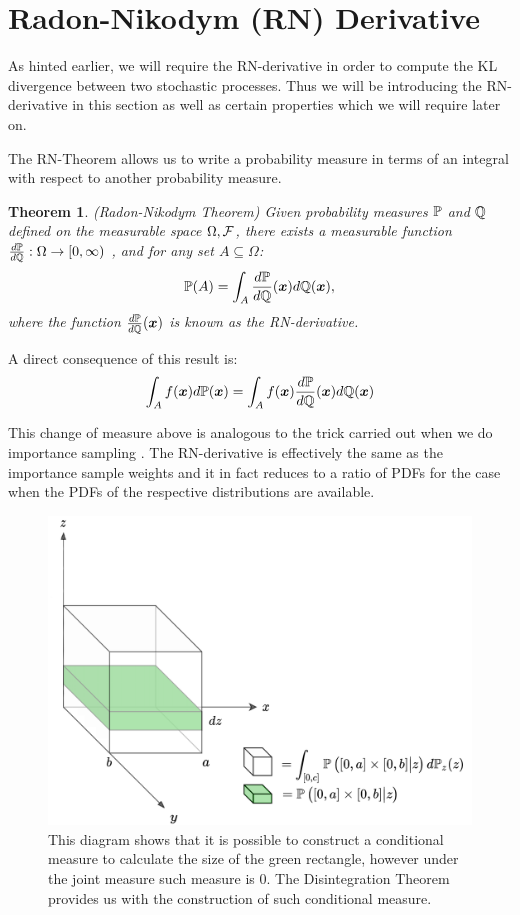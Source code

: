 \documentclass[a4paper,12pt,twoside,openright]{report}
\newtheorem{theorem}{Theorem}
\theoremstyle{definition}
\begin{document}
\section{Radon-Nikodym (RN) Derivative}

As hinted earlier, we will require the RN-derivative in order to compute the KL divergence between two stochastic processes. Thus we will be introducing the RN-derivative in this section as well as certain properties which we will require later on.

The RN-Theorem allows us to write a probability measure in terms of an integral with respect to another probability measure. 

\begin{theorem}
(Radon-Nikodym Theorem)
Given probability measures $\P$ and $\Q$ defined on the measurable space $\Omega, \calF$, there exists a measurable function $\frac{d\P}{d\Q}:\Omega \rightarrow [0, \infty)$ , and for any  set $A \subseteq  \Omega$:
\begin{align}
    \P(A) = \int_{A} \frac{d\P}{d\Q}(\vx) d\Q(\vx),
\end{align}
where the function $\frac{d\P}{d\Q}(\vx)$ is known as the RN-derivative.
\end{theorem}

A direct consequence of this result is:
\begin{align*}
    \int_A f(\vx) d\P(\vx) =  \int_{A} f(\vx)  \frac{d\P}{d\Q}(\vx)  d\Q(\vx)
\end{align*}

This change of measure above is analogous to the trick carried out when we do importance sampling \citep{martino2017effective}. The RN-derivative is effectively the same as the importance sample weights and it in fact reduces to a ratio of PDFs for the case when the PDFs of the respective distributions are available.
\begin{figure}[t!]
    \centering
    \includegraphics[scale=0.3]{images/disint2.png}
    \caption{ This diagram shows that it is possible to construct a conditional measure to calculate the size of the green rectangle, however under the joint measure such measure is $0$. The Disintegration Theorem provides us with the construction of such conditional measure.}
    \label{fig:disintegration}
\end{figure}
\end{document}
